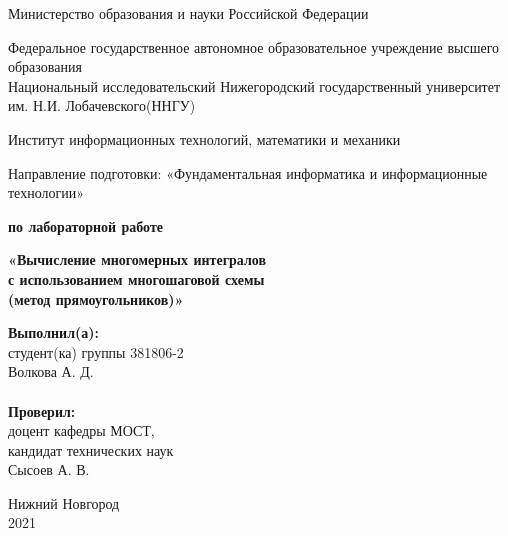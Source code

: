\documentclass{report}
\begin{document}
\begin{titlepage}
\begin{center}
Министерство образования и науки Российской Федерации
\end{center}
\begin{center}
Федеральное государственное автономное образовательное учреждение высшего образования \\
Национальный исследовательский Нижегородский государственный университет им. Н.И. Лобачевского(ННГУ)
\end{center}
\begin{center}
Институт информационных технологий, математики и механики
\end{center}
\begin{center}
Направление подготовки: «Фундаментальная информатика и информационные технологии»
\end{center}

\vspace{2em}

\begin{center}
\textbf{ по лабораторной работе} 
\end{center}
\begin{center}
\textbf{\Large«Вычисление многомерных интегралов \\
с использованием многошаговой схемы \\
(метод прямоугольников)»} \\
\end{center}

\vspace{4em}

\newbox{\lbox}
\newlength{\maxl}
\setlength{\maxl}{\wd\lbox}
\hfill\parbox{7cm}{
\textbf{Выполнил(а):} \\ студент(ка) группы 381806-2 \\ Волкова А. Д.\\
\\
\textbf{Проверил:}\\ доцент кафедры МОСТ, \\ кандидат технических наук \\ Сысоев А. В.\\
}
\vspace{\fill}

\begin{center} Нижний Новгород \\ 2021 \end{center}

\end{titlepage}
\end{document}
